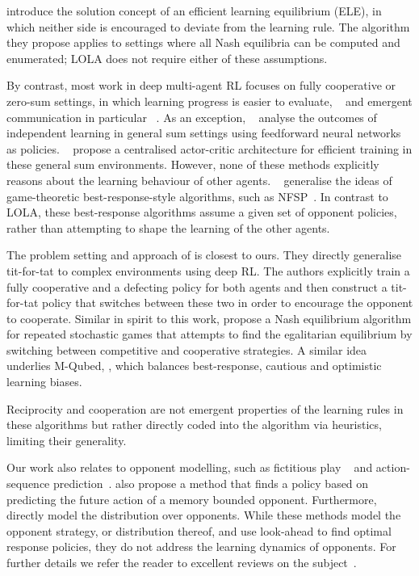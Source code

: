 \citet{brafman03} introduce the solution concept of an efficient learning equilibrium (ELE), in which neither side is encouraged to deviate from the learning rule. The algorithm they propose applies to settings where all Nash equilibria can be computed and enumerated; LOLA does not require either of these assumptions. 

By contrast, most work in deep multi-agent RL focuses on fully cooperative or zero-sum settings, in which learning progress is easier to evaluate, ~\citep{omidshafiei2017deep,foerster2017counterfactual,foerster2017stabilising} and emergent communication in particular ~\citep{das2017learning,mordatch2017emergence,lazaridou2016multi,foerster2016learning,sukhbaatar2016learning}. 
As an exception, ~\citet{leibo2017multi} analyse the outcomes of independent learning in general sum settings using feedforward neural networks as policies.
 ~\citet{lowe2017multi} propose a centralised actor-critic architecture for efficient training in these general sum environments. However, none of these methods explicitly reasons about the learning behaviour of other agents.
 ~\citet{Lanctot17PSRO} generalise the ideas of game-theoretic best-response-style algorithms, such as NFSP~\citep{heinrich2016deep}. In contrast to LOLA, these best-response algorithms assume a given set of opponent policies, rather than attempting to shape the learning of the other agents.


The problem setting and approach of \citet{lerer2017maintaining} is closest to ours.  They directly generalise tit-for-tat to complex environments using deep RL. The authors explicitly train a fully cooperative and a defecting policy for both agents and then construct a tit-for-tat policy that switches between these two in order to encourage the opponent to cooperate. Similar in spirit to this work, \citet{munoz08} propose a Nash equilibrium algorithm for repeated stochastic games that attempts to find the egalitarian equilibrium by switching between competitive and cooperative strategies. A similar idea underlies M-Qubed, \citep{crandall2011learning}, which balances best-response, cautious and optimistic learning biases. 

Reciprocity and cooperation are not emergent properties of the learning rules in these algorithms but rather directly coded into the algorithm via heuristics, limiting their generality. 


 Our work also relates to opponent modelling, such as fictitious play ~\citep{brown1951iterative} and action-sequence prediction~\citep{ mealing2015opponent, rabinowitz2018machine}. \citet{mealing2013opponent} also %
 propose a method that finds a policy based on predicting the future action of a memory bounded opponent. Furthermore, \citet{hernandez2017learning} directly model the distribution over opponents. While these methods model the opponent strategy, or distribution thereof, and use look-ahead to find optimal response policies, they do not address the learning dynamics of opponents.
For further details we refer the reader to excellent reviews on the subject~\citep{hernandez2017survey, busoniu2008comprehensive}.

